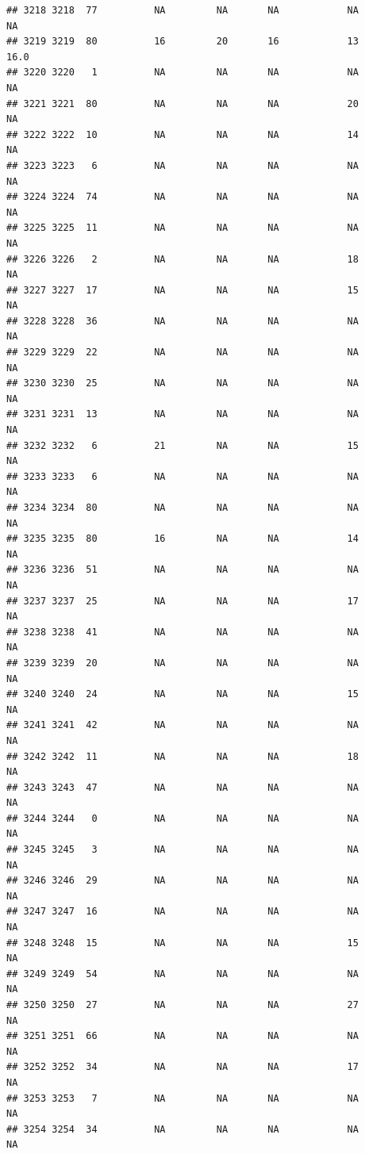 \documentclass[man]{apa6}
\begin{document}
\begin{verbatim}
## 3218 3218  77          NA         NA       NA            NA       NA
## 3219 3219  80          16         20       16            13     16.0
## 3220 3220   1          NA         NA       NA            NA       NA
## 3221 3221  80          NA         NA       NA            20       NA
## 3222 3222  10          NA         NA       NA            14       NA
## 3223 3223   6          NA         NA       NA            NA       NA
## 3224 3224  74          NA         NA       NA            NA       NA
## 3225 3225  11          NA         NA       NA            NA       NA
## 3226 3226   2          NA         NA       NA            18       NA
## 3227 3227  17          NA         NA       NA            15       NA
## 3228 3228  36          NA         NA       NA            NA       NA
## 3229 3229  22          NA         NA       NA            NA       NA
## 3230 3230  25          NA         NA       NA            NA       NA
## 3231 3231  13          NA         NA       NA            NA       NA
## 3232 3232   6          21         NA       NA            15       NA
## 3233 3233   6          NA         NA       NA            NA       NA
## 3234 3234  80          NA         NA       NA            NA       NA
## 3235 3235  80          16         NA       NA            14       NA
## 3236 3236  51          NA         NA       NA            NA       NA
## 3237 3237  25          NA         NA       NA            17       NA
## 3238 3238  41          NA         NA       NA            NA       NA
## 3239 3239  20          NA         NA       NA            NA       NA
## 3240 3240  24          NA         NA       NA            15       NA
## 3241 3241  42          NA         NA       NA            NA       NA
## 3242 3242  11          NA         NA       NA            18       NA
## 3243 3243  47          NA         NA       NA            NA       NA
## 3244 3244   0          NA         NA       NA            NA       NA
## 3245 3245   3          NA         NA       NA            NA       NA
## 3246 3246  29          NA         NA       NA            NA       NA
## 3247 3247  16          NA         NA       NA            NA       NA
## 3248 3248  15          NA         NA       NA            15       NA
## 3249 3249  54          NA         NA       NA            NA       NA
## 3250 3250  27          NA         NA       NA            27       NA
## 3251 3251  66          NA         NA       NA            NA       NA
## 3252 3252  34          NA         NA       NA            17       NA
## 3253 3253   7          NA         NA       NA            NA       NA
## 3254 3254  34          NA         NA       NA            NA       NA

\end{verbatim}
\end{document}
